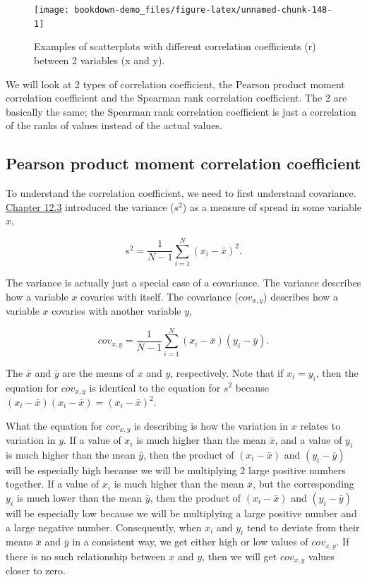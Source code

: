 \documentclass[
]{scrbook}
\begin{document}
\begin{figure}
\texttt{[image: bookdown-demo\_files/figure-latex/unnamed-chunk-148-1]} \caption{Examples of scatterplots with different correlation coefficients (r) between 2 variables (x and y).}\label{fig:unnamed-chunk-148}
\end{figure}

We will look at 2 types of correlation coefficient, the Pearson product moment correlation coefficient and the Spearman rank correlation coefficient.
The 2 are basically the same; the Spearman rank correlation coefficient is just a correlation of the ranks of values instead of the actual values.

\hypertarget{pearson-product-moment-correlation-coefficient}{%
\subsection{Pearson product moment correlation coefficient}\label{pearson-product-moment-correlation-coefficient}}

To understand the correlation coefficient, we need to first understand covariance.
\protect\hyperlink{the-variance}{Chapter 12.3} introduced the variance (\(s^{2}\)) as a measure of spread in some variable \(x\),

\[s^{2} = \frac{1}{N - 1}\sum_{i = 1}^{N}\left(x_{i} - \bar{x} \right)^{2}.\]

The variance is actually just a special case of a covariance.
The variance describes how a variable \(x\) covaries with itself.
The covariance (\(cov_{x,y}\)) describes how a variable \(x\) covaries with another variable \(y\),

\[cov_{x, y} = \frac{1}{N - 1} \sum_{i = 1}^{N}\left(x_{i} - \bar{x} \right) \left(y_{i} - \bar{y} \right).\]

The \(\bar{x}\) and \(\bar{y}\) are the means of \(x\) and \(y\), respectively.
Note that if \(x_{i} = y_{i}\), then the equation for \(cov_{x,y}\) is identical to the equation for \(s^{2}\) because \(\left(x_{i} - \bar{x} \right) \left(x_{i} - \bar{x} \right) = \left(x_{i} - \bar{x} \right)^{2}\).

What the equation for \(cov_{x,y}\) is describing is how the variation in \(x\) relates to variation in \(y\).
If a value of \(x_{i}\) is much higher than the mean \(\bar{x}\), and a value of \(y_{i}\) is much higher than the mean \(\bar{y}\), then the product of \(\left(x_{i} - \bar{x} \right)\) and \(\left(y_{i} - \bar{y} \right)\) will be especially high because we will be multiplying 2 large positive numbers together.
If a value of \(x_{i}\) is much higher than the mean \(\bar{x}\), but the corresponding \(y_{i}\) is much lower than the mean \(\bar{y}\), then the product of \(\left(x_{i} - \bar{x} \right)\) and \(\left(y_{i} - \bar{y} \right)\) will be especially low because we will be multiplying a large positive number and a large negative number.
Consequently, when \(x_{i}\) and \(y_{i}\) tend to deviate from their means \(\bar{x}\) and \(\bar{y}\) in a consistent way, we get either high or low values of \(cov_{x,y}\).
If there is no such relationship between \(x\) and \(y\), then we will get \(cov_{x,y}\) values closer to zero.
\end{document}
